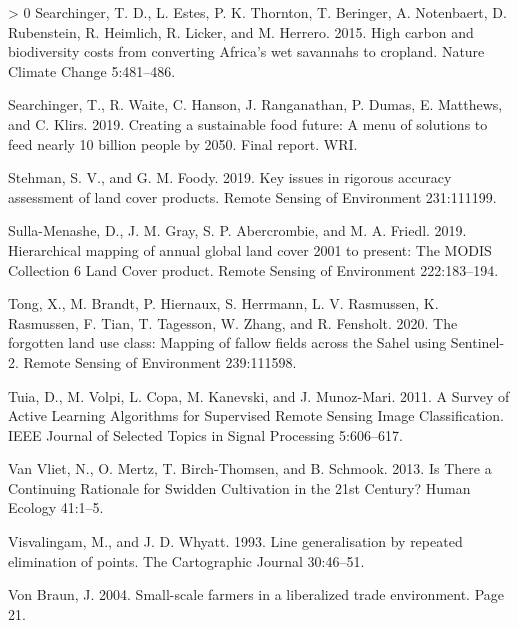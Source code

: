 \documentclass[11pt,a4paper]{article}
\newlength{\cslhangindent}
\newenvironment{CSLReferences}[3] %
 {%
  \setlength{\parindent}{0pt}
  \ifodd #1 \everypar{\setlength{\hangindent}{\cslhangindent}}\ignorespaces\fi
  \ifnum #2 > 0
  \setlength{\parskip}{#2\baselineskip}
  \fi
 }%
 {}
\begin{document}
\begin{CSLReferences}{1}{0}
\leavevmode\hypertarget{ref-SearchingerHighcarbonbiodiversity2015}{}%
Searchinger, T. D., L. Estes, P. K. Thornton, T. Beringer, A.
Notenbaert, D. Rubenstein, R. Heimlich, R. Licker, and M. Herrero. 2015.
High carbon and biodiversity costs from converting {Africa}'s wet
savannahs to cropland. Nature Climate Change 5:481--486.

\leavevmode\hypertarget{ref-searchingerCreatingSustainableFood2019}{}%
Searchinger, T., R. Waite, C. Hanson, J. Ranganathan, P. Dumas, E.
Matthews, and C. Klirs. 2019. Creating a sustainable food future: {A}
menu of solutions to feed nearly 10 billion people by 2050. {Final}
report. {WRI}.

\leavevmode\hypertarget{ref-StehmanKeyissuesrigorous2019}{}%
Stehman, S. V., and G. M. Foody. 2019. Key issues in rigorous accuracy
assessment of land cover products. Remote Sensing of Environment
231:111199.

\leavevmode\hypertarget{ref-sulla-menasheHierarchicalMappingAnnual2019}{}%
Sulla-Menashe, D., J. M. Gray, S. P. Abercrombie, and M. A. Friedl.
2019. Hierarchical mapping of annual global land cover 2001 to present:
{The MODIS Collection} 6 {Land Cover} product. Remote Sensing of
Environment 222:183--194.

\leavevmode\hypertarget{ref-Tongforgottenlanduse2020}{}%
Tong, X., M. Brandt, P. Hiernaux, S. Herrmann, L. V. Rasmussen, K.
Rasmussen, F. Tian, T. Tagesson, W. Zhang, and R. Fensholt. 2020. The
forgotten land use class: {Mapping} of fallow fields across the {Sahel}
using {Sentinel}-2. Remote Sensing of Environment 239:111598.

\leavevmode\hypertarget{ref-tuiaSurveyActiveLearning2011}{}%
Tuia, D., M. Volpi, L. Copa, M. Kanevski, and J. Munoz-Mari. 2011. A
{Survey} of {Active Learning Algorithms} for {Supervised Remote Sensing
Image Classification}. IEEE Journal of Selected Topics in Signal
Processing 5:606--617.

\leavevmode\hypertarget{ref-vanvlietThereContinuingRationale2013}{}%
Van Vliet, N., O. Mertz, T. Birch-Thomsen, and B. Schmook. 2013. Is
{There} a {Continuing Rationale} for {Swidden Cultivation} in the 21st
{Century}? Human Ecology 41:1--5.

\leavevmode\hypertarget{ref-visvalingamLineGeneralisationRepeated1993}{}%
Visvalingam, M., and J. D. Whyatt. 1993. Line generalisation by repeated
elimination of points. The Cartographic Journal 30:46--51.

\leavevmode\hypertarget{ref-VonBraunSmallscalefarmersliberalized2004}{}%
Von Braun, J. 2004. Small-scale farmers in a liberalized trade
environment. Page 21.


\end{CSLReferences}
\end{document}
